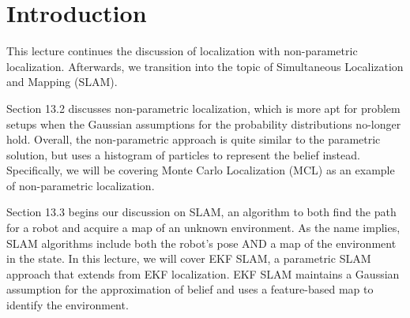 \section{Introduction}

This lecture continues the discussion of localization with non-parametric localization. Afterwards, we transition into the topic of Simultaneous Localization and Mapping (SLAM).

Section 13.2 discusses non-parametric localization, which is more apt for problem setups when the Gaussian assumptions for the probability distributions no-longer hold. Overall, the non-parametric approach is quite similar to the parametric solution, but uses a histogram of particles to represent the belief instead. Specifically, we will be covering Monte Carlo Localization (MCL) as an example of non-parametric localization.

Section 13.3 begins our discussion on SLAM, an algorithm to both find the path for a robot and acquire a map of an unknown environment. As the name implies, SLAM algorithms include both the robot's pose AND a map of the environment in the state. In this lecture, we will cover EKF SLAM, a parametric SLAM approach that extends from EKF localization. EKF SLAM maintains a Gaussian assumption for the approximation of belief and uses a feature-based map to identify the environment.